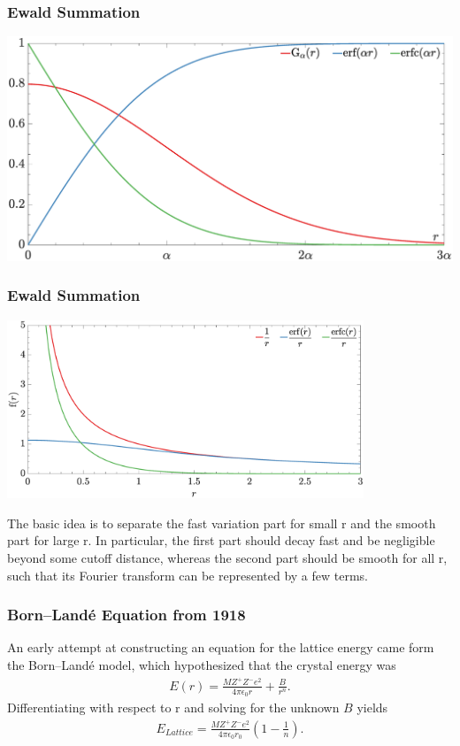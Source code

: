 \documentclass{beamer}
\newenvironment{noheadline}{
	\setbeamertemplate{headline}{}
	\addtobeamertemplate{frametitle}{\vspace*{-0.9\baselineskip}}{}
}{}
\newcommand{\insertcurrentcitation}{}
\newcommand{\currentcitation}[1]{
	\renewcommand{\insertcurrentcitation}{#1}
} %
\begin{document}
\begin{noheadline}
\begin{frame}
\frametitle{Ewald Summation}
	\begin{center}
	\includegraphics[trim={0cm 0cm 0cm 0cm},clip,width=\textwidth]{figures/Error_Functions.eps}
\end{center}
\end{frame}

\begin{frame}
\frametitle{Ewald Summation}
\begin{center}
	\includegraphics[trim={0cm 0cm 0cm 0cm},clip,width=0.8\textwidth]{figures/Screened_Charges.eps}
\end{center}
The basic idea is to separate the fast variation part for small r and the smooth part for large r. In particular,
the first part should decay fast and be negligible beyond some cutoff distance, whereas the second part
should be smooth for all r, such that its Fourier transform can be represented by a few terms.
\end{frame}

\currentcitation{\cite{born1918absolute}}
\begin{frame}
\frametitle{Born–Land\'{e} Equation from 1918}
An early attempt at constructing an equation for the lattice energy came form the Born–Land\'{e} model, which hypothesized that the crystal energy was
\begin{align*}
E (r) = \frac { M Z ^ { + } Z ^ { - } e ^ { 2 } } { 4 \pi \epsilon _ { 0 } r } + \frac { B } { r^n }.
\end{align*}
Differentiating with respect to r and solving for the unknown $B$ yields
\begin{align*}
E_{Lattice} = \frac { M Z ^ { + } Z ^ { - } e ^ { 2 } } { 4 \pi \epsilon _ { 0 } r _ { 0 } } \left( 1 - \frac { 1 } { n } \right).
\end{align*}
\end{frame}


\end{noheadline}
\end{document}
